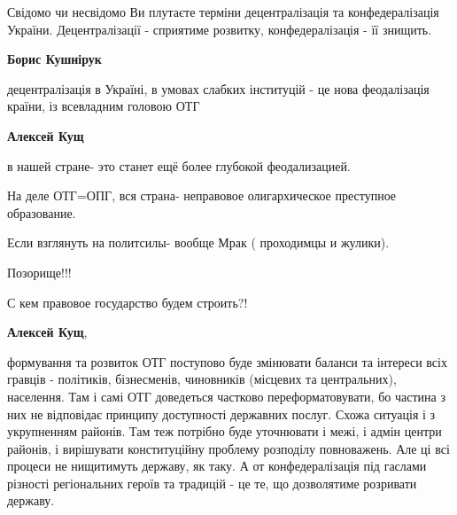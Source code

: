 \begin{itemize}
\begin{itemize}
\end{itemize}

 

Свідомо чи несвідомо Ви плутаєте терміни децентралізація та конфедералізація
України. Децентралізації - сприятиме розвитку, конфедералізація - її знищить.

\begin{itemize}
 
\textbf{Борис Кушнірук} 

децентралізація в Україні, в умовах слабких інституцій - це нова феодалізація
країни, із всевладним головою ОТГ


 
\textbf{Алексей Кущ} 

в нашей стране- это станет ещё более глубокой феодализацией.

На деле ОТГ=ОПГ, вся страна- неправовое олигархическое преступное образование.

Если взглянуть на политсилы- вообще Мрак ( проходимцы и жулики).

Позорище!!!

С кем правовое государство будем строить?!


 
\textbf{Алексей Кущ}, 

формування та розвиток ОТГ поступово буде змінювати баланси та інтереси всіх
гравців - політиків, бізнесменів, чиновників (місцевих та центральних),
населення. Там і самі ОТГ доведеться частково переформатовувати, бо частина з
них не відповідає принципу доступності державних послуг. Схожа ситуація і з
укрупненням районів. Там теж потрібно буде уточнювати і межі, і адмін центри
районів, і вирішувати конституційну проблему розподілу повноважень. Але ці всі
процеси не нищитимуть державу, як таку. А от конфедералізація під гаслами
різності регіональних героїв та традицій - це те, що дозволятиме розривати
державу.



\end{itemize}
\end{itemize}
